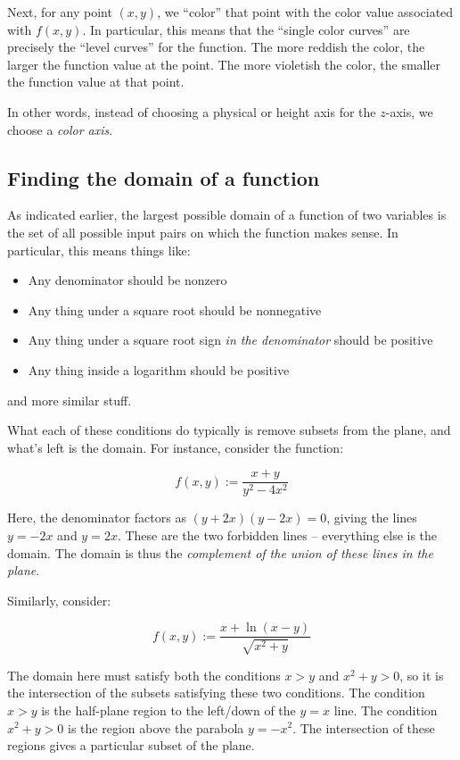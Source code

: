 \documentclass[10pt]{amsart}
\begin{document}
Next, for any point $(x,y)$, we ``color'' that point with the color
value associated with $f(x,y)$. In particular, this means that the
``single color curves'' are precisely the ``level curves'' for the
function. The more reddish the color, the larger the function value at
the point. The more violetish the color, the smaller the function
value at that point.

In other words, instead of choosing a physical or height axis for the
$z$-axis, we choose a {\em color axis}.

\subsection{Finding the domain of a function}

As indicated earlier, the largest possible domain of a function of two
variables is the set of all possible input pairs on which the function
makes sense. In particular, this means things like:

\begin{itemize}
\item Any denominator should be nonzero
\item Any thing under a square root should be nonnegative
\item Any thing under a square root sign {\em in the denominator}
  should be positive
\item Any thing inside a logarithm should be positive
\end{itemize}

and more similar stuff.

What each of these conditions do typically is remove subsets from the
plane, and what's left is the domain. For instance, consider the function:

$$f(x,y) := \frac{x + y}{y^2 - 4x^2}$$

Here, the denominator factors as $(y + 2x)(y - 2x) = 0$, giving the
lines $y = -2x$ and $y = 2x$. These are the two forbidden lines --
everything else is the domain. The domain is thus the {\em complement
of the union of these lines in the plane}.

Similarly, consider:

$$f(x,y) := \frac{x + \ln(x - y)}{\sqrt{x^2 + y}}$$

The domain here must satisfy both the conditions $x > y$ and $x^2 + y
> 0$, so it is the intersection of the subsets satisfying these two
conditions. The condition $x > y$ is the half-plane region to the
left/down of the $y = x$ line. The condition $x^2 + y > 0$ is the
region above the parabola $y = -x^2$. The intersection of these
regions gives a particular subset of the plane.
\end{document}
